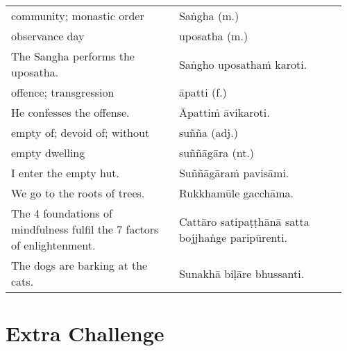 \documentclass[a5paper]{memoir}
\begin{document}
\begin{longtable}{L{0.48\linewidth} L{0.48\linewidth}}
community; monastic order & Saṅgha (m.)\\[0pt]
observance day & uposatha (m.)\\[0pt]
The Sangha performs the uposatha. & Saṅgho uposathaṁ karoti.\\[0pt]
offence; transgression & āpatti (f.)\\[0pt]
He confesses the offense. & Āpattiṁ āvikaroti.\\[0pt]
empty of; devoid of; without & suñña (adj.)\\[0pt]
empty dwelling & suññāgāra (nt.)\\[0pt]
I enter the empty hut. & Suññāgāraṁ pavisāmi.\\[0pt]
We go to the roots of trees. & Rukkhamūle gacchāma.\\[0pt]
The 4 foundations of mindfulness fulfil the 7 factors of enlightenment. & Cattāro satipaṭṭhānā satta bojjhaṅge paripūrenti.\\[0pt]
The dogs are barking at the cats. & Sunakhā biḷāre bhussanti.\\[0pt]
\end{longtable}

\chapter{Extra Challenge}
\label{sec:org0063212}
\end{document}
